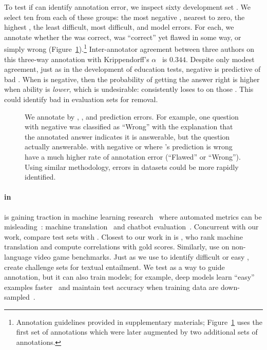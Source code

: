 To test if \irt{} can identify annotation error, we inspect sixty \squad{} development set \itms{}.
We select ten \itms{} from each of these groups: the most negative \discability{}, \discability{} nearest to zero, the highest \discability{}, the least difficult, most difficult, and \irt{} model errors.
For each, we annotate whether the \itm{} was correct, was ``correct'' yet flawed in some way, or simply wrong (Figure~\ref{fig:example-error}).\footnote{
    Annotation guidelines provided in supplementary materials; Figure~\ref{fig:example-error} uses the first set of annotations which were later augmented by two additional sets of annotations.
}
Inter-annotator agreement between three authors on this three-way annotation with Krippendorff's $\alpha$~\citep{kripp2004,artstein-08} is $0.344$.
Despite only modest agreement, just as in the development of education tests, negative \discability{} is predictive of bad \itms{}.
When \discability{} is negative, then the probability of getting
the answer right is higher when ability is \emph{lower}, which is
undesirable: \smart{} consistently loses to \dumb{} on those \itms{}.
This could identify bad \itms{} in evaluation sets for removal.
\begin{figure}[t]
    \centering
    \caption{
        We annotate \squad{} \itms{} by \discability{}, \diff{}, and \irt{} prediction errors.
        For example, one question with negative \discability{} was classified as ``Wrong'' with the explanation that the annotated answer indicates it is  answerable, but the question actually  answerable.
        \Itms{} with negative \discability{} or where \irt{}'s prediction is wrong have a much higher rate of annotation error (``Flawed'' or ``Wrong'').
        Using similar methodology, errors in datasets could be more rapidly identified.
    }
    \label{fig:example-error}
\end{figure}

\paragraph{\textbf{ in }}
\irt{} is gaining traction in machine learning
research~\citep{martinez2016ml,martinez2019irt} where automated metrics can be
misleading~\citep{sedoc2019chateval}: machine
translation~\citep{hopkins2013competitions} and chatbot
evaluation~\citep{sedoc2020irt}.
Concurrent with our work, \citet{vania2021compare} compare \nlp{} test sets with \irt{}.
Closest to our work in \nlp{} is \citet{otani2016aggregation}, who
rank machine translation \subjs{} and compute correlations with gold
scores.  Similarly, \citet{martinez2020indicators} use \irt{} on
non-language  video game benchmarks.
Just as we use \irt{} to identify difficult or easy \itms{},
\citet{lalor2016irt} create challenge sets for textual entailment.
We
test \irt{} as a way to guide annotation, but it can also
train \nlp{} models; for example, deep models learn ``easy'' examples
faster~\citep{lalor2018diff} and maintain test accuracy when training
data are down-sampled~\citep{lalor2019latent}.

